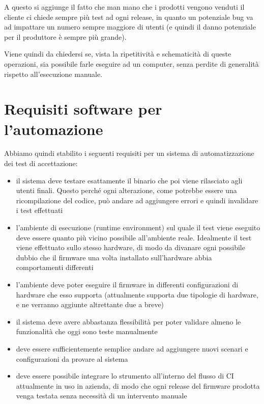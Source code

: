 \documentclass[12pt,a4paper,twoside,titlepage]{book}
\begin{document}
A questo si aggiunge il fatto che man mano che i prodotti vengono venduti il cliente ci
chiede sempre più test ad ogni release, in quanto un potenziale bug va ad impattare un numero
sempre maggiore di utenti (e quindi il danno potenziale per il produttore è sempre più grande).

Viene quindi da chiedersi se, vista la ripetitività e schematicità di queste operazioni,
sia possibile farle eseguire ad un computer, senza perdite di generalità rispetto all'esecuzione
manuale.

\section{Requisiti software per l'automazione}

Abbiamo quindi stabilito i seguenti requisiti per un sistema di automatizzazione dei test di
accettazione:

\begin{itemize}
    \item il sistema deve testare esattamente il binario che poi viene rilasciato agli utenti finali.
        Questo perché ogni alterazione, come potrebbe essere una ricompilazione del codice, può andare
        ad aggiungere errori e quindi invalidare i test effettuati
    \item l'ambiente di esecuzione (runtime environment) sul quale il test viene eseguito deve essere quanto
        più vicino possibile all'ambiente reale. Idealmente il test viene effettuato sullo stesso hardware,
        di modo da divanare ogni possibile dubbio che il \gls{firmware} una volta installato sull'hardware abbia
        comportamenti differenti
    \item l'ambiente deve poter eseguire il \gls{firmware} in differenti configurazioni di hardware che esso supporta
        (attualmente supporta due tipologie di hardware, e ne verranno aggiunte altrettante due a breve)
    \item il sistema deve avere abbastanza flessibilità per poter validare almeno le funzionalità che oggi
        sono teste manualmente
    \item deve essere sufficientemente semplice andare ad aggiungere nuovi scenari e configurazioni da provare al sistema
    \item deve essere possibile integrare lo strumento all'interno del flusso di CI attualmente in
        uso in azienda, di modo che ogni release del \gls{firmware} prodotta venga testata senza necessità di
        un intervento manuale
\end{itemize}
\end{document}
